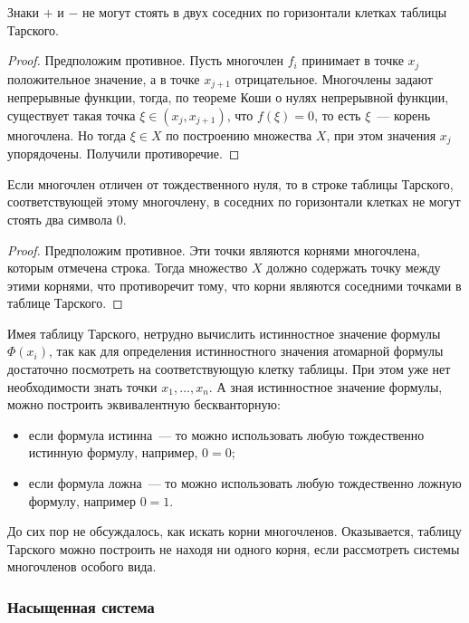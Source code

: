 \begin{proposal}
    Знаки $+$ и $-$ не могут стоять в двух соседних по горизонтали клетках таблицы Тарского.
\end{proposal}
\begin{proof}
    Предположим противное. Пусть многочлен $f_i$ принимает в точке $x_j$ положительное значение, а в точке $x_{j+1}$ отрицательное.
    Многочлены задают непрерывные функции, тогда, по теореме Коши о нулях непрерывной функции, существует такая точка $\xi \in (x_j, x_{j+1})$, что $f(\xi)=0$, то есть $\xi$~--- корень многочлена. Но тогда $\xi \in X$ по построению множества $X$, при этом значения $x_j$ упорядочены. Получили противоречие.
\end{proof}

\begin{proposal}\label{two zero}\cite{lect1}
    Если многочлен отличен от тождественного нуля, то в строке таблицы Тарского, соответствующей этому многочлену, в соседних по горизонтали клетках не могут стоять два символа 0.
\end{proposal}
\begin{proof}
    Предположим противное. Эти точки являются корнями многочлена, которым отмечена строка. Тогда множество $X$ должно содержать точку между этими корнями, что противоречит тому, что корни являются соседними точками в таблице Тарского.
\end{proof}

Имея таблицу Тарского, нетрудно вычислить истинностное значение формулы $\Phi(x_i)$, так как для определения истинностного значения атомарной формулы достаточно посмотреть на соответствующую клетку таблицы. При этом уже нет необходимости знать точки $x_1, ..., x_n$. А зная истинностное значение формулы, можно построить эквивалентную бескванторную:
\begin{itemize}
    \item если формула истинна~--- то можно использовать любую тождественно истинную формулу, например, $0=0$;
    \item если формула ложна~--- то можно использовать любую тождественно ложную формулу, например $0=1$.
\end{itemize}

До сих пор не обсуждалось, как искать корни многочленов. Оказывается, таблицу Тарского можно построить не находя ни одного корня, если рассмотреть системы многочленов особого вида.

\subsubsection{Насыщенная система}

